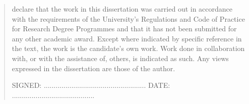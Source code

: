 \documentclass{mimosis-class/mimosis}
\numberwithin{equation}{chapter}
\begin{document}
\label{sec:org8caa555}
\begin{singlespace}
\begin{quote}
 declare that the work in this dissertation was carried out in accordance with the requirements of  the University's Regulations and Code of Practice for Research Degree Programmes and that it  has not been submitted for any other academic award. Except where indicated by specific  reference in the text, the work is the candidate's own work. Work done in collaboration with, or with the assistance of, others, is indicated as such. Any views expressed in the dissertation are those of the author.

\vspace{1.5cm}
\noindent
\hspace{-0.75cm}\textsc{SIGNED: .................................................... DATE: ..........................................}
\end{quote}
\end{singlespace}
\end{document}
